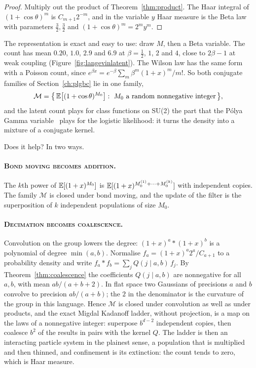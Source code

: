 \begin{proof}
Multiply out the product of Theorem~\ref{thm:product}. The Haar integral of $(1+\cos\theta)^m$ is $C_{m+1}2^{-m}$, and in the variable $y$ Haar measure is the Beta law with parameters $\frac32,\frac32$ and $(1+\cos\theta)^m=2^my^m$.
\end{proof}

The representation is exact and easy to use: draw $M$, then a Beta variable. The count has mean $0.20$, $1.0$, $2.9$ and $6.9$ at $\beta=\frac12$, $1$, $2$ and $4$, close to $2\beta-1$ at weak coupling (Figure~\ref{fig:langevinlatent}). The Wilson law has the same form with a Poisson count, since $e^{\beta x}=e^{-\beta}\sum_m\beta^m(1+x)^m/m!$. So both conjugate families of Section~\ref{ch:plgbc} lie in one family,
\[
\mathcal M=\big\{\,\mathbb{E}\big[(1+\cos\theta)^{M_0}\big]:\ M_0\ \text{a random nonnegative integer}\,\big\},
\]
and the latent count plays for class functions on SU(2) the part that the P\'olya Gamma variable~\cite{PSW13} plays for the logistic likelihood: it turns the density into a mixture of a conjugate kernel.

Does it help? In two ways.

\paragraph{\normalfont\scshape Bond moving becomes addition.} The $k$th power of $\mathbb{E}[(1+x)^{M_0}]$ is $\mathbb{E}[(1+x)^{M_0^{(1)}+\cdots+M_0^{(k)}}]$ with independent copies. The family $\mathcal M$ is closed under bond moving, and the update of the filter is the superposition of $k$ independent populations of size $M_0$.

\paragraph{\normalfont\scshape Decimation becomes coalescence.} Convolution on the group lowers the degree: $(1+x)^a*(1+x)^b$ is a polynomial of degree $\min(a,b)$. Normalise $f_a=(1+x)^a2^a/C_{a+1}$ to a probability density and write $f_a*f_b=\sum_jQ(j\mid a,b)\,f_j$. By Theorem~\ref{thm:coalescence} the coefficients $Q(j\mid a,b)$ are nonnegative for all $a,b$, with mean $ab/(a+b+2)$. In flat space two Gaussians of precisions $a$ and $b$ convolve to precision $ab/(a+b)$; the $2$ in the denominator is the curvature of the group in this language. Hence $\mathcal M$ is closed under convolution as well as under products, and the exact Migdal Kadanoff ladder, without projection, is a map on the laws of a nonnegative integer: superpose $b^{d-2}$ independent copies, then coalesce $b^2$ of the results in pairs with the kernel $Q$. The ladder is then an interacting particle system in the plainest sense, a population that is multiplied and then thinned, and confinement is its extinction: the count tends to zero, which is Haar measure.

